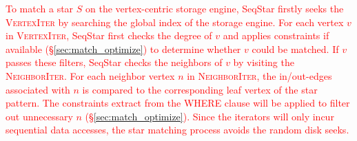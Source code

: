\textcolor{red}{To match a star $S$ on the vertex-centric storage engine,
SeqStar firstly seeks the \textsc{VertexIter} by searching the global index of the storage engine.
For each vertex $v$ in \textsc{VertexIter},
SeqStar first checks the degree of $v$ and applies constraints if available (\S\ref{sec:match_optimize}) to determine whether $v$ could be matched.
If $v$ passes these filters, SeqStar checks the neighbors of $v$ by visiting the \textsc{NeighborIter}.
For each neighbor vertex $n$ in \textsc{NeighborIter},
the in/out-edges associated with $n$ is compared to the corresponding leaf vertex of the star pattern.
The constraints extract from the WHERE clause will be applied to filter out unnecessary $n$ (\S\ref{sec:match_optimize}).
Since the iterators will only incur sequential data accesses,
the star matching process avoids the random disk seeks.}

